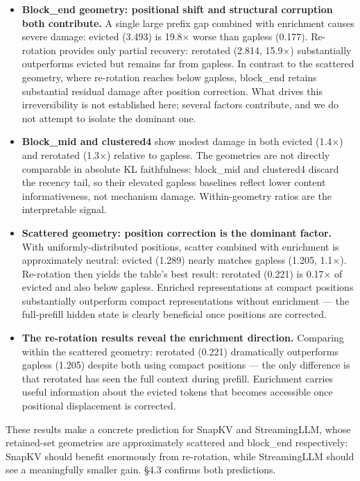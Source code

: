\documentclass[10pt,letterpaper]{article}
\providecommand{\tightlist}{%
  \setlength{\itemsep}{0pt}\setlength{\parskip}{0pt}}
\begin{document}
\begin{itemize}
\tightlist
\item
  \textbf{Block\_end geometry: positional shift and structural
  corruption both contribute.} A single large prefix gap combined with
  enrichment causes severe damage: evicted (3.493) is 19.8× worse than
  gapless (0.177).
  Re-rotation provides only partial recovery: rerotated (2.814, 15.9×)
  substantially outperforms evicted but remains far from gapless. In
  contrast to the scattered geometry, where re-rotation reaches below
  gapless, block\_end retains substantial residual damage after position
  correction. What drives this irreversibility is not established here;
  several factors contribute, and we do not attempt to isolate the
  dominant one.
\item
  \textbf{Block\_mid and clustered4} show modest damage in both evicted
  (1.4×) and rerotated (1.3×) relative to gapless. The geometries are
  not directly comparable in absolute KL faithfulness: block\_mid and
  clustered4 discard the recency tail, so their elevated gapless
  baselines reflect lower content informativeness, not mechanism damage.
  Within-geometry ratios are the interpretable signal.
\item
  \textbf{Scattered geometry: position correction is the dominant
  factor.} With uniformly-distributed positions, scatter combined with
  enrichment is approximately neutral: evicted (1.289) nearly matches
  gapless (1.205, 1.1×). Re-rotation then yields the table's best
  result: rerotated (0.221) is 0.17× of evicted and also below gapless.
  Enriched representations at compact positions substantially outperform
  compact representations without enrichment --- the full-prefill hidden
  state is clearly beneficial once positions are corrected.
\item
  \textbf{The re-rotation results reveal the enrichment direction.}
  Comparing within the scattered geometry: rerotated (0.221) dramatically
  outperforms gapless (1.205) despite both using compact positions ---
  the only difference is that rerotated has seen the full context during
  prefill. Enrichment carries useful information about the evicted tokens
  that becomes accessible once positional displacement is corrected.
\end{itemize}

These results make a concrete prediction for SnapKV and StreamingLLM,
whose retained-set geometries are approximately scattered and block\_end
respectively: SnapKV should benefit enormously from re-rotation, while
StreamingLLM should see a meaningfully smaller gain.
§4.3 confirms both predictions.
\end{document}
